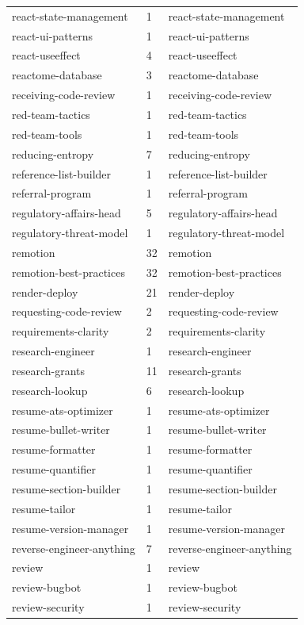 \begin{longtable}{@{}lll@{}}
react-state-management & 1 & react-state-management\\
react-ui-patterns & 1 & react-ui-patterns\\
react-useeffect & 4 & react-useeffect\\
reactome-database & 3 & reactome-database\\
receiving-code-review & 1 & receiving-code-review\\
red-team-tactics & 1 & red-team-tactics\\
red-team-tools & 1 & red-team-tools\\
reducing-entropy & 7 & reducing-entropy\\
reference-list-builder & 1 & reference-list-builder\\
referral-program & 1 & referral-program\\
regulatory-affairs-head & 5 & regulatory-affairs-head\\
regulatory-threat-model & 1 & regulatory-threat-model\\
remotion & 32 & remotion\\
remotion-best-practices & 32 & remotion-best-practices\\
render-deploy & 21 & render-deploy\\
requesting-code-review & 2 & requesting-code-review\\
requirements-clarity & 2 & requirements-clarity\\
research-engineer & 1 & research-engineer\\
research-grants & 11 & research-grants\\
research-lookup & 6 & research-lookup\\
resume-ats-optimizer & 1 & resume-ats-optimizer\\
resume-bullet-writer & 1 & resume-bullet-writer\\
resume-formatter & 1 & resume-formatter\\
resume-quantifier & 1 & resume-quantifier\\
resume-section-builder & 1 & resume-section-builder\\
resume-tailor & 1 & resume-tailor\\
resume-version-manager & 1 & resume-version-manager\\
reverse-engineer-anything & 7 & reverse-engineer-anything\\
review & 1 & review\\
review-bugbot & 1 & review-bugbot\\
review-security & 1 & review-security\\

\end{longtable}
